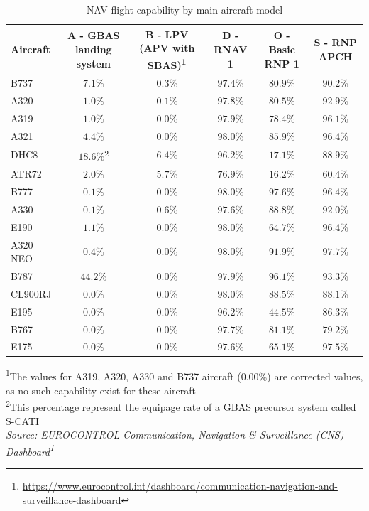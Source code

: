 \documentclass[
  11pt,
  a4paper,
]{book}
\DeclareRobustCommand{\href}[2]{#2\footnote{\url{#1}}}
\begin{document}
\hypertarget{tbl-nav-flight_aircraft}{}
\setlength{\LTpost}{0mm}
\begin{longtable}{lccccc}
\caption{\label{tbl-nav-flight_aircraft}NAV flight capability by main aircraft model }\tabularnewline

\toprule
Aircraft & A - GBAS landing system & B - LPV (APV with SBAS)\textsuperscript{1} & D - RNAV 1 & O - Basic RNP 1 & S - RNP APCH \\ 
\midrule
B737 & $7.1\%$ & $0.3\%$ & $97.4\%$ & $80.9\%$ & $90.2\%$ \\ 
A320 & $1.0\%$ & $0.1\%$ & $97.8\%$ & $80.5\%$ & $92.9\%$ \\ 
A319 & $1.0\%$ & $0.0\%$ & $97.9\%$ & $78.4\%$ & $96.1\%$ \\ 
A321 & $4.4\%$ & $0.0\%$ & $98.0\%$ & $85.9\%$ & $96.4\%$ \\ 
DHC8 & $18.6\%$\textsuperscript{2} & $6.4\%$ & $96.2\%$ & $17.1\%$ & $88.9\%$ \\ 
ATR72 & $2.0\%$ & $5.7\%$ & $76.9\%$ & $16.2\%$ & $60.4\%$ \\ 
B777 & $0.1\%$ & $0.0\%$ & $98.0\%$ & $97.6\%$ & $96.4\%$ \\ 
A330 & $0.1\%$ & $0.6\%$ & $97.6\%$ & $88.8\%$ & $92.0\%$ \\ 
E190 & $1.1\%$ & $0.0\%$ & $98.0\%$ & $64.7\%$ & $96.4\%$ \\ 
A320 NEO & $0.4\%$ & $0.0\%$ & $98.0\%$ & $91.9\%$ & $97.7\%$ \\ 
B787 & $44.2\%$ & $0.0\%$ & $97.9\%$ & $96.1\%$ & $93.3\%$ \\ 
CL900RJ & $0.0\%$ & $0.0\%$ & $98.0\%$ & $88.5\%$ & $88.1\%$ \\ 
E195 & $0.0\%$ & $0.0\%$ & $96.2\%$ & $44.5\%$ & $86.3\%$ \\ 
B767 & $0.0\%$ & $0.0\%$ & $97.7\%$ & $81.1\%$ & $79.2\%$ \\ 
E175 & $0.0\%$ & $0.0\%$ & $97.6\%$ & $65.1\%$ & $97.5\%$ \\ 
\bottomrule
\end{longtable}
\begin{minipage}{\linewidth}
\textsuperscript{1}The values for A319, A320, A330 and B737 aircraft (0.00\%) are corrected values, as no such capability exist for these aircraft\\
\textsuperscript{2}This percentage represent the equipage rate of a GBAS precursor system called S-CATI\\
\emph{Source: \href{https://www.eurocontrol.int/dashboard/communication-navigation-and-surveillance-dashboard}{EUROCONTROL Communication, Navigation \& Surveillance (CNS) Dashboard}}\\
\end{minipage}
\end{document}
